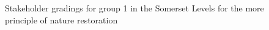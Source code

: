 \documentclass[
  12pt,
  letterpaper,
  DIV=11,
  numbers=noendperiod]{scrartcl}
\begin{document}
\begin{figure}[H]


\caption{\label{fig-SomMoreG1}Stakeholder gradings for group 1 in the
Somerset Levels for the more principle of nature restoration}

\end{figure}%
\end{document}
